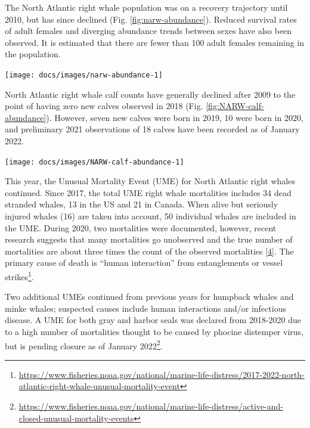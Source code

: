 \documentclass[
  10pt,
]{article}
\let\origfigure\figure
\let\endorigfigure\endfigure
\renewenvironment{figure}[1][2] {
    \expandafter\origfigure\expandafter[H]
} {
    \endorigfigure
}
\begin{document}
The North Atlantic right whale population was on a recovery trajectory
until 2010, but has since declined (Fig. \ref{fig:narw-abundance}).
Reduced survival rates of adult females and diverging abundance trends
between sexes have also been observed. It is estimated that there are
fewer than 100 adult females remaining in the population.

\begin{figure}

{\centering \texttt{[image: docs/images/narw-abundance-1]} 

}

\caption{Estimated North Atlanic right whale abundance on the Northeast Shelf.}\label{fig:narw-abundance}
\end{figure}

North Atlantic right whale calf counts have generally declined after
2009 to the point of having zero new calves observed in 2018 (Fig.
\ref{fig:NARW-calf-abundance}). However, seven new calves were born in
2019, 10 were born in 2020, and preliminary 2021 observations of 18
calves have been recorded as of January 2022.\\

\begin{figure}

{\centering \texttt{[image: docs/images/NARW-calf-abundance-1]} 

}

\caption{Number of North Atlantic right whale calf births, 1990 - 2021.}\label{fig:NARW-calf-abundance}
\end{figure}

This year, the Unusual Mortality Event (UME) for North Atlantic right
whales continued. Since 2017, the total UME right whale mortalities
includes 34 dead stranded whales, 13 in the US and 21 in Canada. When
alive but seriously injured whales (16) are taken into account, 50
individual whales are included in the UME. During 2020, two mortalities
were documented, however, recent research suggests that many mortalities
go unobserved and the true number of mortalities are about three times
the count of the observed mortalities
{[}\protect\hyperlink{ref-pace_cryptic_2021}{4}{]}. The primary cause of
death is ``human interaction'' from entanglements or vessel
strikes\footnote{\url{https://www.fisheries.noaa.gov/national/marine-life-distress/2017-2022-north-atlantic-right-whale-unusual-mortality-event}}.

Two additional UMEs continued from previous years for humpback whales
and minke whales; suspected causes include human interactions and/or
infectious disease. A UME for both gray and harbor seals was declared
from 2018-2020 due to a high number of mortalities thought to be caused
by phocine distemper virus, but is pending closure as of January
2022\footnote{\url{https://www.fisheries.noaa.gov/national/marine-life-distress/active-and-closed-unusual-mortality-events}}.
\end{document}
